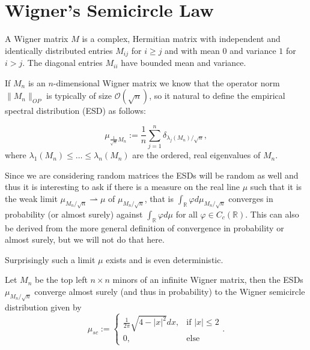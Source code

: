 \section{Wigner's Semicircle Law}
\begin{definition}
	A Wigner matrix $M$ is a complex, Hermitian matrix with independent and identically distributed entries $M_{ij}$ for $i\geq j$ and with mean $0$ and variance $1$ for $i>j$. The diagonal entries $M_{ii}$ have bounded mean and variance.
\end{definition}


If $M_n$ is an $n$-dimensional Wigner matrix we know that the operator norm $\|M_n\|_{OP}$ is typically of size $\mathcal O(\sqrt n)$, so it natural to define the empirical spectral distribution (ESD) as follows:

\begin{definition}[ESD]
	\begin{equation*}
		\mu_{\frac{1}{\sqrt{n}}M_n}:=\frac{1}{n}\sum_{j=1}^n \delta_{\lambda_j(M_n)/\sqrt{n}},
	\end{equation*}
	where $\lambda_1(M_n)\leq\dots\leq\lambda_n(M_n)$ are the ordered, real eigenvalues of $M_n$.
\end{definition}

Since we are considering random matrices the ESDs will be random as well and thus it is interesting to ask if there is a measure on the real line $\mu$ such that it is the weak limit $\mu_{M_n/\sqrt{n}}\rightharpoonup\mu$ of $\mu_{M_n/\sqrt{n}}$, that is $\int_\mathbb{R} \varphi d\mu_{M_n/\sqrt{n}}$ converges in probability (or almost surely)  against $\int_\mathbb{R} \varphi d\mu$ for all $\varphi\in C_c(\mathbb R)$. This can also be derived from the more general definition of convergence in probability or almost surely, but we will not do that here.

Surprisingly such a limit $\mu$ exists and is even deterministic.

\begin{theorem}\label{thm:semicircle}
	Let $M_n$ be the top left $n\times n$ minors of an infinite Wigner matrix, then the ESDs $\mu_{M_n/\sqrt{n}}$ converge almost surely (and thus in probability) to the Wigner semicircle distribution given by
	\begin{equation*}
		\mu_{sc}:=\begin{cases}
						\frac{1}{2\pi}\sqrt{4-|x|^2}dx, &\mbox{if } |x|\leq 2 \\
						0, &\mbox{else}
					  \end{cases}.
	\end{equation*}
\end{theorem}

